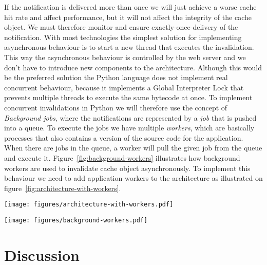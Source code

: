 If the notification is delivered more than once we will just achieve a worse cache hit rate and affect performance, but it will not affect the integrity of the cache object. We must therefore monitor and ensure exactly-once-delivery of the notification.
With most technologies the simplest solution for implementing asynchronous behaviour is to start a new thread that executes the invalidation. This way the asynchronous behaviour is controlled by the web server and we don't have to introduce new components to the architecture. Although this would be the preferred solution the Python language does not implement real concurrent behaviour, because it implements a Global Interpreter Lock that prevents multiple threads to execute the same bytecode at once.
To implement concurrent invalidations in Python we will therefore use the concept of \emph{Background jobs}, where the notifications are represented by a \emph{job} that is pushed into a queue. To execute the jobs we have multiple \emph{workers}, which are basically processes that also contains a version of the source code for the application. When there are jobs in the queue, a worker will pull the given job from the queue and execute it. Figure~\ref{fig:background-workers} illustrates how background workers are used to invalidate cache object asynchronously. To implement this behaviour we need to add application workers to the architecture as illustrated on figure~\ref{fig:architecture-with-workers}.

\begin{figure*}[ht!]
  \centering
  \texttt{[image: figures/architecture-with-workers.pdf]}
  \caption{The architecture required by a web application that uses Smache with automatic invalidation.}
  \label{fig:architecture-with-workers}
\end{figure*}

\begin{figure*}[ht!]
  \centering
  \texttt{[image: figures/background-workers.pdf]}
  \caption{How background workers are used do perform invalidation asynchronously.}
  \label{fig:background-workers}
\end{figure*}



\section{Discussion}
\label{sec:invalidation-discussion}

